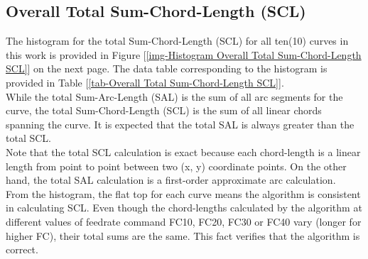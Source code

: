 \clearpage
\pagebreak

\subsection{Overall Total Sum-Chord-Length (SCL)}


The histogram for the total Sum-Chord-Length (SCL) for all ten(10) curves in this work is provided in Figure [\ref{img-Histogram Overall Total Sum-Chord-Length SCL}] on the next page. The data table corresponding to the histogram is provided in Table [\ref{tab-Overall Total Sum-Chord-Length SCL}]. \\

While the total Sum-Arc-Length (SAL) is the sum of all arc segments for the curve, the total Sum-Chord-Length (SCL) is the sum of all linear chords spanning the curve. It is expected that the total SAL is always greater than the total SCL. \\

Note that the total SCL calculation is exact because each chord-length is a linear length from point to point between two (x, y) coordinate points. On the other hand, the total SAL calculation is a first-order approximate arc calculation.\\

From the histogram, the flat top for each curve means the algorithm is consistent in calculating SCL. Even though the chord-lengths calculated by the algorithm at different values of feedrate command FC10, FC20, FC30 or FC40 vary (longer for higher FC), their total sums are the same. This fact verifies that the algorithm is correct.\\ 


